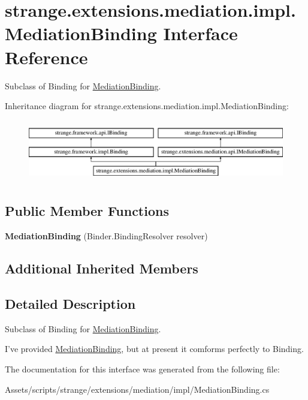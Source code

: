 \hypertarget{classstrange_1_1extensions_1_1mediation_1_1impl_1_1_mediation_binding}{\section{strange.\-extensions.\-mediation.\-impl.\-Mediation\-Binding Interface Reference}
\label{classstrange_1_1extensions_1_1mediation_1_1impl_1_1_mediation_binding}
}


Subclass of Binding for \hyperlink{classstrange_1_1extensions_1_1mediation_1_1impl_1_1_mediation_binding}{Mediation\-Binding}.  


Inheritance diagram for strange.\-extensions.\-mediation.\-impl.\-Mediation\-Binding\-:\begin{figure}[H]
\begin{center}
\leavevmode
\includegraphics[height=2.718446cm]{classstrange_1_1extensions_1_1mediation_1_1impl_1_1_mediation_binding}
\end{center}
\end{figure}
\subsection*{Public Member Functions}
\begin{DoxyCompactItemize}
\item 
\hypertarget{classstrange_1_1extensions_1_1mediation_1_1impl_1_1_mediation_binding_af9ec0b3b01c9f59c9fe21e55b736dc57}{{\bfseries Mediation\-Binding} (Binder.\-Binding\-Resolver resolver)}\label{classstrange_1_1extensions_1_1mediation_1_1impl_1_1_mediation_binding_af9ec0b3b01c9f59c9fe21e55b736dc57}

\end{DoxyCompactItemize}
\subsection*{Additional Inherited Members}


\subsection{Detailed Description}
Subclass of Binding for \hyperlink{classstrange_1_1extensions_1_1mediation_1_1impl_1_1_mediation_binding}{Mediation\-Binding}. 

I've provided \hyperlink{classstrange_1_1extensions_1_1mediation_1_1impl_1_1_mediation_binding}{Mediation\-Binding}, but at present it comforms perfectly to Binding. 

The documentation for this interface was generated from the following file\-:\begin{DoxyCompactItemize}
\item 
Assets/scripts/strange/extensions/mediation/impl/Mediation\-Binding.\-cs\end{DoxyCompactItemize}
